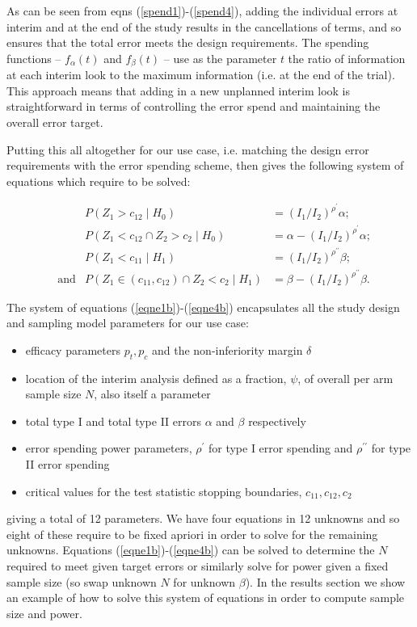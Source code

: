 \documentclass{article}
\begin{document}
As can be seen from eqns (\ref{spend1})-(\ref{spend4}), adding the individual errors at interim and at the end of the study results in the cancellations of terms, and so ensures that the total error meets the design requirements. The spending functions -- $f_\alpha(t)$ and $f_\beta(t)$ -- use as the parameter $t$ the ratio of information at each interim look to the maximum information (i.e. at the end of the trial). This approach means that adding in a new unplanned interim look is straightforward in terms of controlling the error spend and maintaining the overall error target. 

Putting this all altogether for our use case, i.e. matching the design error requirements with the error spending scheme, then gives the following system of equations which require to be solved:
 
 \begin{fleqn}
\begin{align}
&&P(Z_{1}>c_ {12}\mid{H_ 0})&=(I_ {1}/I_{2})^{\rho^\prime} \alpha;\label{eqne1b}\\[2pt]
&&P(Z_{1}<c_ {12} \cap Z_{2}>c_ {2}\mid{H_ 0})&=\alpha -(I_ {1}/I_{2})^{\rho^\prime}\alpha;\label{eqne2b}\\[2pt]
&&P(Z_{1}<c_ {11}\mid{H_ 1})&=(I_ {1}/I_{2})^{\rho^{\prime\prime}} \beta;\label{eqne3b}\\[2pt]
&\text{and}&P(Z_ {1}\in(c_{11},c_{12}) \cap Z_{2}<c_ {2}\mid{H_ 1})&=\beta -(I_ {1}/I_{2})^{\rho^{\prime\prime}}\beta.\label{eqne4b}
\end{align}
\end{fleqn}

The system of equations (\ref{eqne1b})-(\ref{eqne4b}) encapsulates all the study design and sampling model parameters for our use case:
\begin{itemize}
 \item efficacy parameters $p_t, p_c$ and the non-inferiority margin $\delta$
 \item location of the interim analysis defined as a fraction, $\psi$, of overall per arm sample size $N$, also itself a parameter
 \item total type I and total type II errors $\alpha$ and $\beta$ respectively
 \item error spending power parameters, $\rho^\prime$ for type I error spending and $\rho^{\prime\prime}$ for type II error spending
 \item critical values for the test statistic stopping boundaries, $c_{11}, c_{12}, c_2$ 
 \end{itemize}
 giving a total of 12 parameters. We have four equations in 12 unknowns and so eight of these require to be fixed apriori in order to solve for the remaining unknowns.  Equations (\ref{eqne1b})-(\ref{eqne4b}) can be solved to determine the $N$ required to meet given target errors or similarly solve for power given a fixed sample size (so swap unknown $N$ for unknown $\beta$). In the results section we show an example of how to solve this system of equations in order to compute sample size and power. 
 
\end{document}

